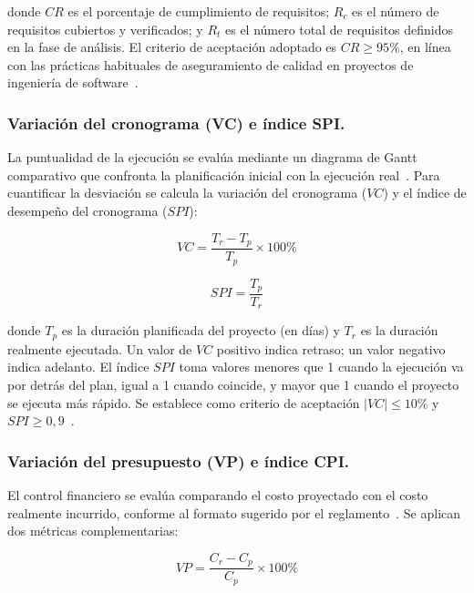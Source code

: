 					donde $CR$ es el porcentaje de cumplimiento de requisitos; $R_c$ es el número de requisitos cubiertos y verificados; y $R_t$ es el número total de requisitos definidos en la fase de análisis. El criterio de aceptación adoptado es $CR \geq 95\%$, en línea con las prácticas habituales de aseguramiento de calidad en proyectos de ingeniería de software~\cite{Fowler2002}.
					
				\subsubsection{Variación del cronograma (VC) e índice SPI.}
					La puntualidad de la ejecución se evalúa mediante un diagrama de Gantt comparativo que confronta la planificación inicial con la ejecución real~\cite{GuerreroUlloa2024}. Para cuantificar la desviación se calcula la variación del cronograma ($VC$) y el índice de desempeño del cronograma ($SPI$):
					
					\begin{equation}
						\label{ec:vc}
						VC = \frac{T_r - T_p}{T_p} \times 100\%
					\end{equation}
					
					\begin{equation}
						\label{ec:spi}
						SPI = \frac{T_p}{T_r}
					\end{equation}
					
					donde $T_p$ es la duración planificada del proyecto (en días) y $T_r$ es la duración realmente ejecutada. Un valor de $VC$ positivo indica retraso; un valor negativo indica adelanto. El índice $SPI$ toma valores menores que 1 cuando la ejecución va por detrás del plan, igual a 1 cuando coincide, y mayor que 1 cuando el proyecto se ejecuta más rápido. Se establece como criterio de aceptación $|VC| \leq 10\%$ y $SPI \geq 0{,}9$~\cite{Creswell2018}.
					
				\subsubsection{Variación del presupuesto (VP) e índice CPI.}
					El control financiero se evalúa comparando el costo proyectado con el costo realmente incurrido, conforme al formato sugerido por el reglamento~\cite{GuerreroUlloa2024}. Se aplican dos métricas complementarias:
					
					\begin{equation}
						\label{ec:vp}
						VP = \frac{C_r - C_p}{C_p} \times 100\%
					\end{equation}
					
